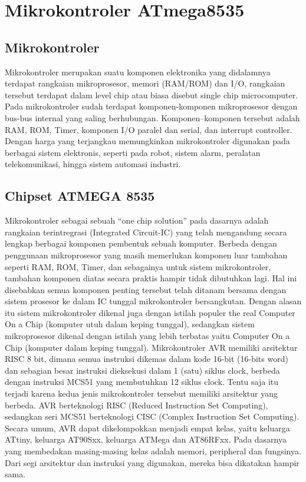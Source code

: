 \section{Mikrokontroler ATmega8535}

	\subsection{Mikrokontroler}
		Mikrokontroler merupakan suatu komponen elektronika yang didalamnya terdapat rangkaian mikroprosesor, memori (RAM/ROM) dan I/O, rangkaian tersebut terdapat dalam level chip atau biasa disebut single chip microcomputer. Pada mikrokontroler sudah terdapat komponen-komponen mikroprosesor dengan bus-bus internal yang saling berhubungan. Komponen–komponen tersebut adalah RAM, ROM, Timer, komponen I/O paralel dan serial, dan interrupt controller. Dengan harga yang terjangkau memungkinkan mikrokontroler digunakan pada berbagai sistem elektronis, seperti pada robot, sistem alarm, peralatan telekomunikasi, hingga sistem automasi industri.
		
	\subsection{Chipset ATMEGA 8535}
		Mikrokontroler sebagai sebuah “one chip solution” pada dasarnya adalah rangkaian terintregrasi (Integrated Circuit-IC) yang telah mengandung secara lengkap berbagai komponen pembentuk sebuah komputer. Berbeda dengan penggunaan mikroprosesor yang masih memerlukan komponen luar tambahan seperti RAM, ROM, Timer, dan sebagainya untuk sistem mikrokontroler, tambahan komponen diatas secara praktis hampir tidak dibutuhkan lagi. Hal ini disebabkan semua komponen penting tersebut telah ditanam bersama dengan sistem prosesor ke dalam IC tunggal mikrokontroler bersangkutan. Dengan alasan itu sistem mikrokontroler dikenal juga dengan istilah populer the real Computer On a Chip (komputer utuh dalam keping tunggal), sedangkan sistem mikroprosesor dikenal dengan istilah yang 	lebih terbatas yaitu Computer On a Chip (komputer dalam keping tunggal).
		Mikrokontroler AVR memiliki arsitektur RISC 8 bit, dimana semua instruksi dikemas dalam kode 16-bit (16-bits word) dan sebagian besar instruksi dieksekusi dalam 1 (satu) siklus clock, berbeda dengan instruksi MCS51 yang membutuhkan 12 siklus clock. Tentu saja itu terjadi karena kedua jenis mikrokontroler tersebut memiliki arsitektur yang berbeda. AVR berteknologi RISC (Reduced Instruction Set Computing), sedangkan seri MCS51 berteknologi CISC (Complex Instruction Set Computing). Secara umum, AVR dapat dikelompokkan menjadi empat kelas, yaitu keluarga ATtiny, keluarga AT90Sxx, keluarga ATMega dan AT86RFxx. Pada dasarnya yang membedakan masing-masing kelas adalah memori, peripheral dan fungsinya. Dari segi arsitektur dan instruksi yang digunakan, mereka bisa dikatakan hampir sama.

